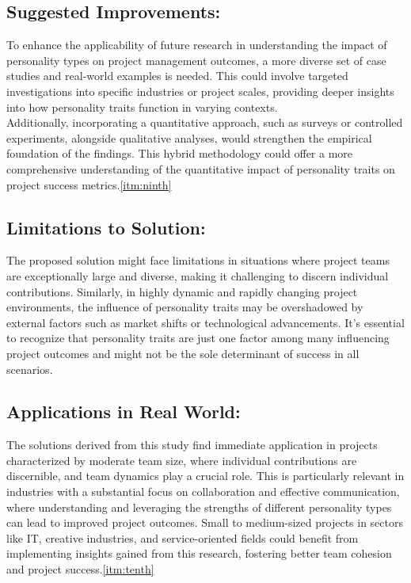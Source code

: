 \documentclass[a4Paper]{article}
\begin{document}
\subsection{Suggested Improvements: } To enhance the applicability of future research in understanding the impact of personality types on project management outcomes, a more diverse set of case studies and real-world examples is needed. This could involve targeted investigations into specific industries or project scales, providing deeper insights into how personality traits function in varying contexts.\\

Additionally, incorporating a quantitative approach, such as surveys or controlled experiments, alongside qualitative analyses, would strengthen the empirical foundation of the findings. This hybrid methodology could offer a more comprehensive understanding of the quantitative impact of personality traits on project success metrics.\ref{itm:ninth} \\

\subsection{Limitations to Solution: } The proposed solution might face limitations in situations where project teams are exceptionally large and diverse, making it challenging to discern individual contributions. Similarly, in highly dynamic and rapidly changing project environments, the influence of personality traits may be overshadowed by external factors such as market shifts or technological advancements. It's essential to recognize that personality traits are just one factor among many influencing project outcomes and might not be the sole determinant of success in all scenarios. \\

\subsection{ Applications in Real World: } The solutions derived from this study find immediate application in projects characterized by moderate team size, where individual contributions are discernible, and team dynamics play a crucial role. This is particularly relevant in industries with a substantial focus on collaboration and effective communication, where understanding and leveraging the strengths of different personality types can lead to improved project outcomes. Small to medium-sized projects in sectors like IT, creative industries, and service-oriented fields could benefit from implementing insights gained from this research, fostering better team cohesion and project success.\ref{itm:tenth} \\
\end{document}
